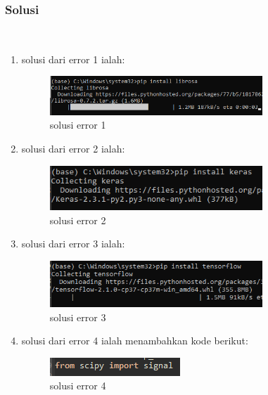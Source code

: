 \subsubsection{Solusi}
\hfill\\
\begin{enumerate}
\item solusi dari error 1 ialah:
\begin{figure}[H]
	\centering
	\includegraphics[width=8cm]{figures/1174083/figures6/s1.png}
	\caption{solusi error 1}
\end{figure}

\item solusi dari error 2 ialah:
\begin{figure}[H]
	\centering
	\includegraphics[width=8cm]{figures/1174083/figures6/s2.png}
	\caption{solusi error 2}
\end{figure}

\item solusi dari error 3 ialah:
\begin{figure}[H]
	\centering
	\includegraphics[width=8cm]{figures/1174083/figures6/s3.png}
	\caption{solusi error 3}
\end{figure}

\item solusi dari error 4 ialah menambahkan kode berikut:
\begin{figure}[H]
	\centering
	\includegraphics{figures/1174083/figures6/s4.png}
	\caption{solusi error 4}
\end{figure}
\end{enumerate}

